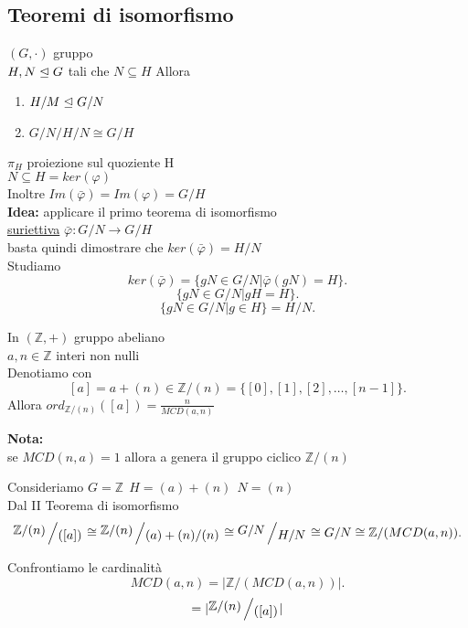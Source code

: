 \documentclass[12px]{article}
\begin{document}
{	\subsection{Teoremi di isomorfismo}
	\begin{teo}
		$(G,\cdot)$ gruppo\\
		$H,N\trianglelefteq G$ tali che $N\subseteq H$ Allora
		 \begin{enumerate}
			 \item$ H/M\trianglelefteq G/N $
			 \item $G/N/H/N \cong G/H$
		 \end{enumerate}
	\end{teo}
	\begin{dimo}
$\pi_H$ proiezione sul quoziente H\\
$N\subseteq H = ker ( \varphi)$ \\
Inoltre $Im( \bar\varphi) = Im( \varphi) = G/H$\\
\textbf{Idea:} applicare il primo teorema di isomorfismo\\
\underline{suriettiva} $\bar \varphi: G/N \rightarrow G/H$\\
basta quindi dimostrare che $ker (\bar \varphi) = H/N$\\
Studiamo
\[
ker(\bar \varphi) = \lbrace gN\in G/N | \bar \varphi(gN) = H\rbrace
.\] 
\[
	\{gN\in G/N | gH = H\}
.\] 
\[
	\{gN\in G/N | g\in H\} = H/N
.\] 
	\end{dimo}
	\begin{coro}
		In $(\mathbb Z, +)$ gruppo abeliano\\$a,n\in \mathbb Z$ interi non nulli\\
		Denotiamo con
		\[
			[a] = a + (n) \in \mathbb Z/(n) = \{ [0],[1],[2],\ldots,[n-1]\}
		.\] 
		Allora $ord_{\mathbb Z/(n)}([a]) = \frac n {MCD(a,n)}$
	\end{coro}
	\textbf{Nota:}\\
	se $MCD(n,a) = 1$ allora a genera il gruppo ciclico  $\mathbb Z/(n)$
	 \begin{dimo}
		Consideriamo $G=\mathbb Z \ \ H = (a) + (n) \ \ N= (n)$\\
		Dal II Teorema di isomorfismo
		 \[
			 \bigslant{\mathbb Z/(n)}{([a])
			 }\cong\bigslant{\mathbb Z/(n)}{(a) + (n)/(n)} \cong \bigslant {G/N}{H/N}\cong G/N \cong \mathbb Z/(MCD(a,n))
		.\] 
	\end{dimo}
	Confrontiamo le cardinalità\\
	\[
	MCD(a,n) = |\mathbb Z/(MCD(a,n))|
	.\] 
	\[
		= |\bigslant{\mathbb Z/ (n)}{([a])}|

\]}
\end{document}
